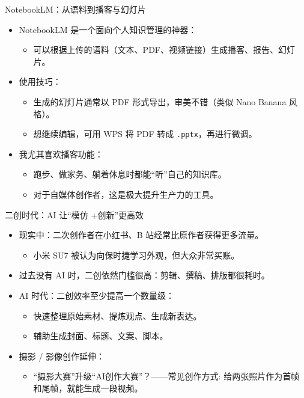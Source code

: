 \documentclass[10pt,aspectratio=169]{beamer}
\begin{document}
\begin{frame}{NotebookLM：从语料到播客与幻灯片}
  \begin{itemize}
    \item NotebookLM 是一个面向个人知识管理的神器：
      \begin{itemize}
        \item 可以根据上传的语料（文本、PDF、视频链接）生成播客、报告、幻灯片。
      \end{itemize}
    \item 使用技巧：
      \begin{itemize}
        \item 生成的幻灯片通常以 PDF 形式导出，审美不错（类似 Nano Banana 风格）。
        \item 想继续编辑，可用 WPS 将 PDF 转成 \texttt{.pptx}，再进行微调。
      \end{itemize}
    \item 我尤其喜欢播客功能：
      \begin{itemize}
        \item 跑步、做家务、躺着休息时都能“听”自己的知识库。
        \item 对于自媒体创作者，这是极大提升生产力的工具。
      \end{itemize}
  \end{itemize}
\end{frame}

\begin{frame}{二创时代：AI 让“模仿 +创新”更高效}
  \begin{itemize}
    \item 现实中：二次创作者在小红书、B 站经常比原作者获得更多流量。
      \begin{itemize}
        \item 小米 SU7 被认为向保时捷学习外观，但大众非常买账。
      \end{itemize}
    \item 过去没有 AI 时，二创依然门槛很高：剪辑、撰稿、排版都很耗时。
    \item AI 时代：二创效率至少提高一个数量级：
      \begin{itemize}
        \item 快速整理原始素材、提炼观点、生成新表达。
        \item 辅助生成封面、标题、文案、脚本。
      \end{itemize}
    \item 摄影 / 影像创作延伸：
      \begin{itemize}
        \item “摄影大赛”升级“AI创作大赛”？——常见创作方式: 给两张照片作为首帧和尾帧，就能生成一段视频。
      \end{itemize}
  \end{itemize}
\end{frame}
\end{document}
